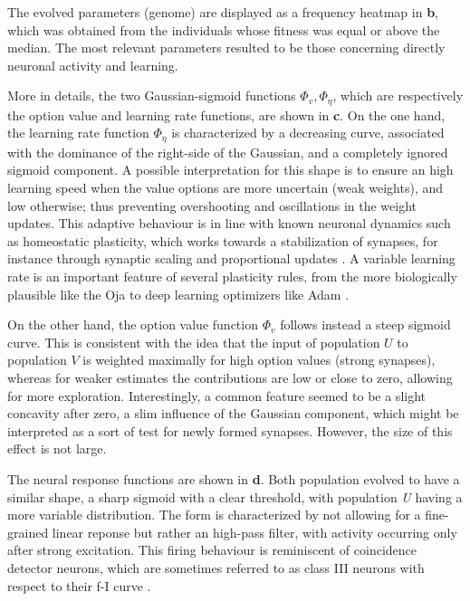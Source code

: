 The evolved parameters (genome) are displayed as a frequency heatmap in \textbf{b}, which was obtained from the individuals whose fitness was equal or above the median. The most relevant parameters resulted to be those concerning directly neuronal activity and learning.

More in details, the two Gaussian-sigmoid functions $\Phi_{v}, \Phi_{\eta}$, which are respectively the option value and learning rate functions, are shown in \textbf{c}.
On the one hand, the learning rate function $\Phi_{\eta}$ is characterized by a decreasing curve, associated with the dominance of the right-side of the Gaussian, and a completely ignored sigmoid component.
A possible interpretation for this shape is to ensure an high learning speed when the value options are more uncertain (weak weights), and low otherwise; thus preventing overshooting and oscillations in the weight updates.
This adaptive behaviour is in line with known neuronal dynamics such as homeostatic plasticity, which works towards a stabilization of synapses, for instance through synaptic scaling and proportional updates \cite{citriSynapticPlasticityMultiple2008}.
A variable learning rate is an important feature of several plasticity rules, from the more biologically plausible like the Oja \cite{ojaOjaLearningRule2008} to deep learning optimizers like Adam \cite{kingmaAdamMethodStochastic2017}.

On the other hand, the option value function $\Phi_{v}$ follows instead a steep sigmoid curve.
This is consistent with the idea that the input of population $U$ to population $V$ is weighted maximally for high option values (strong synapses), whereas for weaker estimates the contributions are low or close to zero, allowing for more exploration.
Interestingly, a common feature seemed to be a slight concavity after zero, a slim influence of the Gaussian component, which might be interpreted as a sort of test for newly formed synapses. However, the size of this effect is not large.

The neural response functions are shown in \textbf{d}. Both population evolved to have a similar shape, a sharp sigmoid with a clear threshold, with population \textit{U} having a more variable distribution.
The form is characterized by not allowing for a fine-grained linear reponse but rather an high-pass filter, with activity occurring only after strong excitation.
This firing behaviour is reminiscent of coincidence detector neurons, which are sometimes referred to as class III neurons with respect to their f-I curve \cite{ratteImpactNeuronalProperties2013}.


